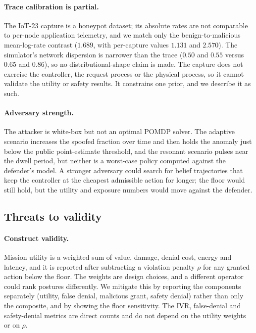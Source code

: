 \paragraph{Trace calibration is partial.} The IoT-23 capture is a honeypot
dataset; its absolute rates are not comparable to per-node application telemetry,
and we match only the benign-to-malicious mean-log-rate contrast ($1.689$, with
per-capture values $1.131$ and $2.570$). The simulator's network dispersion is
narrower than the trace ($0.50$ and $0.55$ versus $0.65$ and $0.86$), so no
distributional-shape claim is made. The capture does not exercise the controller,
the request process or the physical process, so it cannot validate the utility or
safety results. It constrains one prior, and we describe it as such.

\paragraph{Adversary strength.} The attacker is white-box but not an optimal
POMDP solver. The adaptive scenario increases the spoofed fraction over time and
then holds the anomaly just below the public point-estimate threshold, and the
resonant scenario pulses near the dwell period, but neither is a worst-case policy
computed against the defender's model. A stronger adversary could search for
belief trajectories that keep the controller at the cheapest admissible action for
longer; the floor would still hold, but the utility and exposure numbers would move
against the defender.

\subsection{Threats to validity}
\label{sec:validity}

\paragraph{Construct validity.} Mission utility is a weighted sum of value,
damage, denial cost, energy and latency, and it is reported after subtracting a
violation penalty $\rho$ for any granted action below the floor. The weights are
design choices, and a different operator could rank postures differently. We
mitigate this by reporting the components separately (utility, false denial,
malicious grant, safety denial) rather than only the composite, and by showing the
floor sensitivity. The IVR, false-denial and safety-denial metrics are direct
counts and do not depend on the utility weights or on $\rho$.

